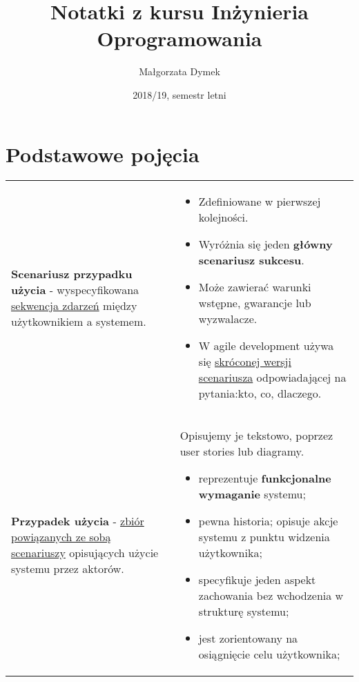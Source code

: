 \documentclass[a4paper]{article}
\title{Notatki z kursu Inżynieria Oprogramowania}
\author{Małgorzata Dymek}
\date{2018/19, semestr letni}
\begin{document}
    \maketitle


    \section{Podstawowe pojęcia}
    \begin{table}[H]
        \begin{center}
            \begin{tabular}{  p{6cm} p{10cm}  }

                \textbf{Scenariusz przypadku użycia} - wyspecyfikowana \underline{sekwencja zdarzeń} między użytkownikiem a systemem.
                &
                \begin{itemize}
                    \item Zdefiniowane w pierwszej kolejności.
                    \item Wyróżnia się jeden \textbf{główny scenariusz sukcesu}.
                    \item Może zawierać warunki wstępne, gwarancje lub wyzwalacze.
                    \item W agile development używa się \underline{skróconej wersji scenariusza} odpowiadającej
                    na pytania:kto, co, dlaczego.
                \end{itemize}
                \\

                \cmidrule(r){1-1}\cmidrule(l){2-2}

                \textbf{Przypadek użycia} - \underline{zbiór powiązanych ze sobą scenariuszy} opisujących użycie systemu przez aktorów.
                &
                Opisujemy je tekstowo, poprzez user stories lub diagramy.
                \begin{itemize}
                    \item reprezentuje \textbf{funkcjonalne wymaganie} systemu;
                    \item pewna historia; opisuje akcje systemu z punktu widzenia użytkownika;
                    \item specyfikuje jeden aspekt zachowania bez wchodzenia w strukturę systemu;
                    \item jest zorientowany na osiągnięcie celu użytkownika;
                \end{itemize}
                \\

            \end{tabular}
        \end{center}
    \end{table}
\end{document}
